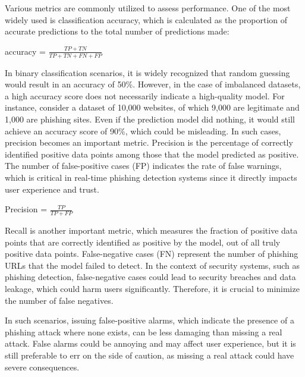 \documentclass[final]{cvpr}
\begin{document}
Various metrics are commonly utilized to assess performance. One of the most widely used is classification accuracy, which is calculated as the proportion of accurate predictions to the total number of predictions made:

\vspace{7pt}
accuracy = $\frac{TP+TN}
{TP+TN+FN+FP}$

\vspace{7pt}

In binary classification scenarios, it is widely recognized that random guessing would result in an accuracy of 50\%. However, in the case of imbalanced datasets, a high accuracy score does not necessarily indicate a high-quality model. For instance, consider a dataset of 10,000 websites, of which 9,000 are legitimate and 1,000 are phishing sites. Even if the prediction model did nothing, it would still achieve an accuracy score of 90\%, which could be misleading. In such cases, precision becomes an important metric. Precision is the percentage of correctly identified positive data points among those that the model predicted as positive. The number of false-positive cases (FP) indicates the rate of false warnings, which is critical in real-time phishing detection systems since it directly impacts user experience and trust.

\vspace{7pt}

Precision = $\frac{TP}
{TP + FP}$

\vspace{7pt}

Recall is another important metric, which measures the fraction of positive data points that are correctly identified as positive by the model, out of all truly positive data points. False-negative cases (FN) represent the number of phishing URLs that the model failed to detect. In the context of security systems, such as phishing detection, false-negative cases could lead to security breaches and data leakage, which could harm users significantly. Therefore, it is crucial to minimize the number of false negatives.

In such scenarios, issuing false-positive alarms, which indicate the presence of a phishing attack where none exists, can be less damaging than missing a real attack. False alarms could be annoying and may affect user experience, but it is still preferable to err on the side of caution, as missing a real attack could have severe consequences.

\vspace{7pt}
\end{document}
